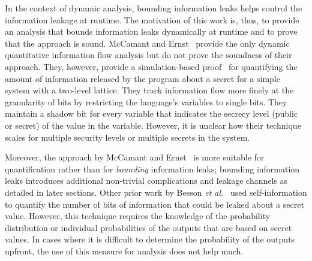 
In the context of dynamic analysis, bounding information leaks helps
control the information leakage at runtime. The motivation of this
work is, thus, to provide an analysis that bounds information leaks
dynamically at runtime and to prove that the approach is sound. 
McCamant and Ernst~\cite{mccamant} provide the only dynamic 
quantitative information flow analysis but do not prove the
soundness of their approach. They, however, provide a simulation-based 
proof~\cite{plas07} for quantifying the amount of information
released by the program about a secret for a simple system with a
two-level lattice. They track information flow more finely at the
granularity of bits by restricting the language's variables to single
bits. They maintain a shadow bit for every variable that
indicates the secrecy level (public or secret) of the value in the
variable. However, it is unclear how their technique scales for
multiple security levels or multiple secrets in the system. 

Moreover, the approach by McCamant and Ernst~\cite{mccamant} 
is more suitable for quantification rather than for \emph{bounding} 
information leaks; bounding information leaks introduces additional 
non-trivial complications and leakage channels as detailed in later
sections. Other prior work by Besson \emph{et al.}~\cite{csf13} 
used self-information to
quantify the number of bits of information that could be leaked about
a secret value. However, this technique requires the knowledge of the
probability distribution or individual probabilities of the outputs
that are based on secret values. In cases where it is difficult to
determine the probability of the outputs upfront, the use of this
measure for analysis does not help much.   

